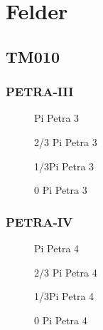 \chapter{Felder}
\label{sec:appendix_felder}

\section{TM010}

\subsection{PETRA-III}
\FloatBarrier
\begin{figure}[h]
  \centering
  
  \caption{Pi Petra 3}
\end{figure}

\begin{figure}[h]
  \centering
  
  \caption{2/3 Pi Petra 3}
\end{figure}

\begin{figure}[h]
  \centering
  
  \caption{1/3Pi Petra 3}
\end{figure}

\begin{figure}[h]
  \centering
  
  \caption{0 Pi Petra 3}
\end{figure}
\FloatBarrier

\subsection{PETRA-IV}
\FloatBarrier
\begin{figure}[h]
  \centering
  
  \caption{Pi Petra 4}
\end{figure}

\begin{figure}[h]
  \centering
  
  \caption{2/3 Pi Petra 4}
\end{figure}

\begin{figure}[h]
  \centering
  
  \caption{1/3Pi Petra 4}
\end{figure}

\begin{figure}[h]
  \centering
  
  \caption{0 Pi Petra 4}
\end{figure}
\FloatBarrier
